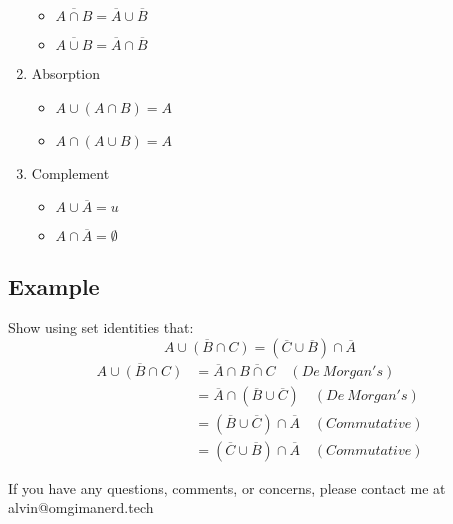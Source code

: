 \documentclass[letterpaper, 12pt]{math}
\begin{document}
\begin{enumerate}
  \begin{itemize}
    \item \( \overline{A \cap B} = \overline{A} \cup \overline{B} \)
    \item \( \overline{A \cup B} = \overline{A} \cap \overline{B} \)
  \end{itemize}
  \item Absorption
  \begin{itemize}
    \item \( A \cup (A \cap B) = A \)
    \item \( A \cap (A \cup B) = A \)
  \end{itemize}
  \item Complement
  \begin{itemize}
    \item \( A \cup \overline{A} = u \)
    \item \( A \cap \overline{A} = \emptyset \)
  \end{itemize}
\end{enumerate}

\subsection*{Example}
Show using set identities that:
\[ \overline{A \cup (B \cap C)} = (\overline{C} \cup \overline{B}) \cap
   \overline{A} \]
\begin{align*}
  \overline{A \cup (B \cap C)} &=
    \overline{A} \cap \overline{B \cap C} \quad (De\ Morgan's) \\
  &= \overline{A} \cap (\overline{B} \cup \overline{C}) \quad (De\ Morgan's) \\
  &= (\overline{B} \cup \overline{C}) \cap \overline{A} \quad (Commutative) \\
  &= (\overline{C} \cup \overline{B}) \cap \overline{A} \quad (Commutative)
\end{align*}

\begin{center}
  If you have any questions, comments, or concerns, please contact me at
  alvin@omgimanerd.tech
\end{center}
\end{document}
